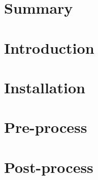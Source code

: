 \documentclass[a4paper,english,11pt,twoside,openright]{Contents/Styles/tesisupc}
\begin{document}




\tableofcontents


\chapter*{Summary}\label{chSummary}




\chapter{Introduction}\label{chIntroduction}




\chapter{Installation}\label{chInstallation}




\chapter{Pre-process}\label{chPreProcess}




\chapter{Post-process}\label{chPostProcess}



\end{document}
